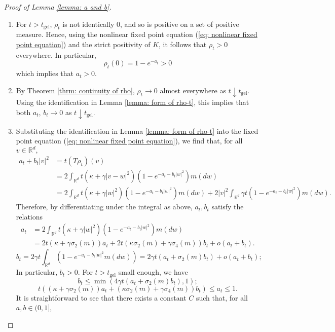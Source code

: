 \begin{proof}[Proof of Lemma \ref{lemma: a and b}] \begin{enumerate}[label=\roman{*}).]
    \item For $t>t_\mathrm{gel}$, $\rho_t$ is not identically $0$, and so is positive on a set of positive measure. Hence, using the nonlinear fixed point equation (\ref{eq: nonlinear fixed point equation}) and the strict positivity of $K$, it follows that $\rho_t>0$ everywhere. In particular, \begin{equation}
        \rho_t(0)=1-e^{-a_t}>0
    \end{equation} which implies that $a_t>0.$
    \item By Theorem \ref{thrm: continuity of rho},  $\rho_t\rightarrow 0$ almost everywhere as $t\downarrow t_\mathrm{gel}$. Using the identification in Lemma \ref{lemma: form of rho-t}, this implies that both $a_t$, $b_t \rightarrow 0$ as $t\downarrow t_\mathrm{gel}$.
    \item Substituting the identification in Lemma \ref{lemma: form of rho-t} into the fixed point equation (\ref{eq: nonlinear fixed point equation}), we find that, for all $v\in \mathbb{R}^d,$ \begin{equation}\begin{split} a_t+b_t|v|^2 &= t(T\rho_t)(v)\\ & =2\int_{\mathbb{R}^d}t(\kappa+\gamma|v-w|^2)\left(1-e^{-a_t-b_t|w|^2}\right)m(dw) \\ & = 2\int_{\mathbb{R}^d} t(\kappa+\gamma|w|^2)\left(1-e^{-a_t-b_t|w|^2}\right)m(dw)+2|v|^2\int_{\mathbb{R}^d}\gamma t \left(1-e^{-a_t-b_t|w|^2}\right)m(dw). \end{split} \end{equation} Therefore, by differentiating under the integral as above, $a_t, b_t$ satisfy the relations \begin{equation} \begin{split}
        a_t&=2\int_{\mathbb{R}^d} t(\kappa+\gamma|w|^2)\left(1-e^{-a_t-b_t|w|^2}\right)m(dw)\\[1ex]&=2t(\kappa+\gamma\sigma_2(m))a_t+2t(\kappa\sigma_2(m)+\gamma\sigma_4(m))b_t+o(a_t+b_t).
   \end{split} \end{equation}\begin{equation}
        b_t=2\gamma t\int_{\mathbb{R}^d}\left(1-e^{-a_t-b_t|w|^2}m(dw)\right)= 2\gamma t(a_t+\sigma_2(m) b_t)+o(a_t+b_t);
    \end{equation} In particular, $b_t>0$. For $t>t_\mathrm{gel}$ small enough, we have \begin{equation} b_t\le \min\left(4\gamma t(a_t+\sigma_2(m)b_t),1\right);  \end{equation} \begin{equation}  t((\kappa+\gamma\sigma_2(m))a_t+(\kappa\sigma_2(m)+\gamma\sigma_4(m))b_t) \le a_t \le 1. \end{equation} It is straightforward to see that there exists a constant $C$ such that, for all $a, b \in (0,1]$, \begin{equation}

\end{equation}
\end{enumerate}
\end{proof}
